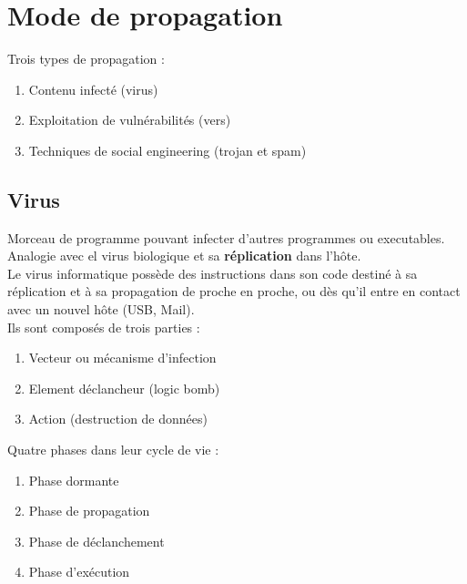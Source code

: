 \documentclass{report}
\begin{document}
	\section{Mode de propagation}

		Trois types de propagation : \\

		\begin{enumerate}
			\item Contenu infecté (virus)
			\item Exploitation de vulnérabilités (vers)
			\item Techniques de social engineering (trojan et spam)\\
		\end{enumerate}

		\subsection{Virus}

			Morceau de programme pouvant infecter d'autres programmes ou executables.\\
			Analogie avec el virus biologique et sa \textbf{réplication} dans l'hôte.\\

			Le virus informatique possède des instructions dans son code destiné à sa réplication et à sa propagation de proche en proche, ou dès qu'il entre en contact avec un nouvel hôte (USB, Mail).\\

			Ils sont composés de trois parties : \\

			\begin{enumerate}
				\item Vecteur ou mécanisme d'infection
				\item Element déclancheur (logic bomb)
				\item Action (destruction de données)\\
			\end{enumerate}

			Quatre phases dans leur cycle de vie : \\

			\begin{enumerate}
				\item Phase dormante
				\item Phase de propagation
				\item Phase de déclanchement
				\item Phase d'exécution
			\end{enumerate}
\end{document}
